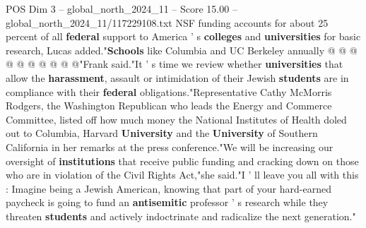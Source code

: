 \begin{textsample}{POS Dim 3 – global\_north\_2024\_11 – Score 15.00 – global\_north\_2024\_11/117229108.txt}
NSF funding accounts for about 25 percent of all \textbf{federal} support to America ' s \textbf{colleges} and \textbf{universities} for basic research, Lucas added."\textbf{Schools} like Columbia and UC Berkeley annually @ @ @ @ @ @ @ @ @ @"Frank said."It ' s time we review whether \textbf{universities} that allow the \textbf{harassment}, assault or intimidation of their Jewish \textbf{students} are in compliance with their \textbf{federal} obligations."Representative Cathy McMorris Rodgers, the Washington Republican who leads the Energy and Commerce Committee, listed off how much money the National Institutes of Health doled out to Columbia, Harvard \textbf{University} and the \textbf{University} of Southern California in her remarks at the press conference."We will be increasing our oversight of \textbf{institutions} that receive public funding and cracking down on those who are in violation of the Civil Rights Act,"she said."I ' ll leave you all with this : Imagine being a Jewish American, knowing that part of your hard-earned paycheck is going to fund an \textbf{antisemitic} professor ' s research while they threaten \textbf{students} and actively indoctrinate and radicalize the next generation."

\end{textsample}
